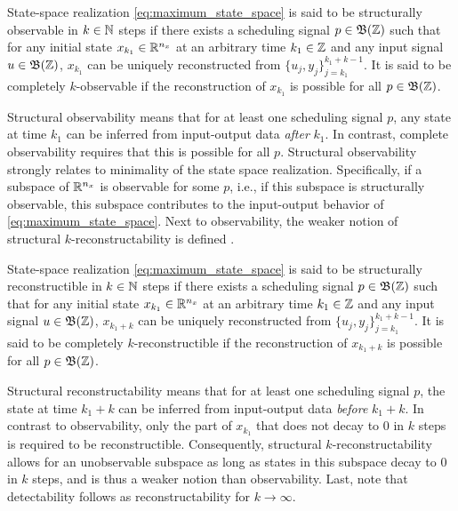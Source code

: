 \begin{definition}
\label{def:obsv_DT}
   State-space realization \eqref{eq:maximum_state_space} is said to be structurally observable in $k\in\mathbb{N}$ steps if there exists a scheduling signal $p\in\mathfrak{B}(\mathbb{Z})$ such that for any initial state $x_{k_1}\in\mathbb{R}^{n_x}$ at an arbitrary time $k_1\in\mathbb{Z}$ and any input signal $u\in\mathfrak{B}(\mathbb{Z})$, $x_{k_1}$ can be uniquely reconstructed from $\{ u_{j}, y_{j} \}_{j=k_1}^{k_1+k-1}$. It is said to be completely $k$-observable if the reconstruction of $x_{k_1}$ is possible for all $p\in\mathfrak{B}(\mathbb{Z})$.
\end{definition}
Structural observability means that for at least one scheduling signal $p$, any state at time $k_1$ can be inferred from input-output data \textit{after} $k_1$. In contrast, complete observability requires that this is possible for all $p$. Structural observability strongly relates to minimality of the state space realization. Specifically, if a subspace of $\mathbb{R}^{n_x}$ is observable for some $p$, i.e., if this subspace is structurally observable, this subspace contributes to the input-output behavior of \eqref{eq:maximum_state_space}. Next to observability, the weaker notion of structural $k$-reconstructability is defined \cite{Silverman1967, Gohberg1992, Toth2010}.

\begin{definition}
\label{def:recon_DT}
    State-space realization \eqref{eq:maximum_state_space} is said to be structurally reconstructible in $k\in\mathbb{N}$ steps if there exists a scheduling signal $p\in\mathfrak{B}(\mathbb{Z})$ such that for any initial state $x_{k_1}\in\mathbb{R}^{n_x}$ at an arbitrary time $k_1\in\mathbb{Z}$ and any input signal $u\in\mathfrak{B}(\mathbb{Z})$, $x_{k_1+k}$ can be uniquely reconstructed from $\{ u_{j}, y_{j} \}_{j=k_1}^{k_1+k-1}$. It is said to be completely $k$-reconstructible if the reconstruction of $x_{k_1+k}$ is possible for all $p\in\mathfrak{B}(\mathbb{Z})$.
\end{definition}
Structural reconstructability means that for at least one scheduling signal $p$, the state at time $k_1+k$ can be inferred from input-output data \textit{before} $k_1+k$. In contrast to observability, only the part of $x_{k_1}$ that does not decay to 0 in $k$ steps is required to be reconstructible. Consequently, structural $k$-reconstructability allows for an unobservable subspace as long as states in this subspace decay to $0$ in $k$ steps, and is thus a weaker notion than observability. Last, note that detectability follows as reconstructability for $k\rightarrow\infty$. 


